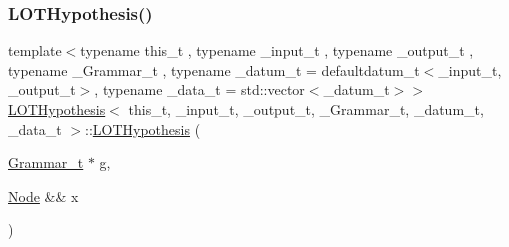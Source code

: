 \mbox{\label{class_l_o_t_hypothesis_a96d283ef0e69bbf25b139b10ccb948de}} 
\subsubsection{\texorpdfstring{L\+O\+T\+Hypothesis()}{LOTHypothesis()}\hspace{0.1cm}{\footnotesize\ttfamily [2/4]}}
{\footnotesize\ttfamily template$<$typename this\+\_\+t , typename \+\_\+input\+\_\+t , typename \+\_\+output\+\_\+t , typename \+\_\+\+Grammar\+\_\+t , typename \+\_\+datum\+\_\+t  = defaultdatum\+\_\+t$<$\+\_\+input\+\_\+t, \+\_\+output\+\_\+t$>$, typename \+\_\+data\+\_\+t  = std\+::vector$<$\+\_\+datum\+\_\+t$>$$>$ \\
\hyperlink{class_l_o_t_hypothesis}{L\+O\+T\+Hypothesis}$<$ this\+\_\+t, \+\_\+input\+\_\+t, \+\_\+output\+\_\+t, \+\_\+\+Grammar\+\_\+t, \+\_\+datum\+\_\+t, \+\_\+data\+\_\+t $>$\+::\hyperlink{class_l_o_t_hypothesis}{L\+O\+T\+Hypothesis} (\begin{DoxyParamCaption}\item[{\hyperlink{class_l_o_t_hypothesis_a5393058e614835e0f139bd40acb183b2}{Grammar\+\_\+t} $\ast$}]{g,  }\item[{\hyperlink{class_node}{Node} \&\&}]{x }\end{DoxyParamCaption})\hspace{0.3cm}{\ttfamily [inline]}}

\mbox{\label{class_l_o_t_hypothesis_a62a7f0b9fa6f2c409395428e1234dd52}} 
